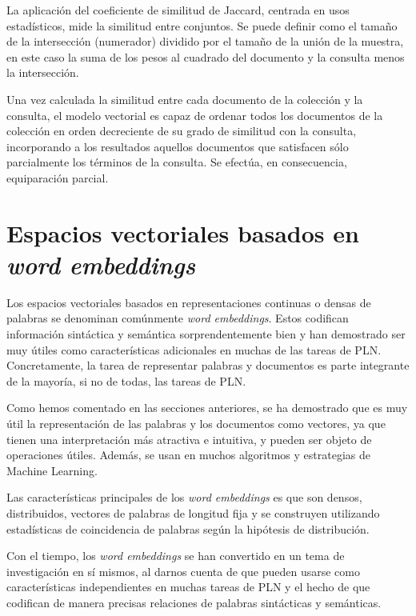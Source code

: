 \documentclass[titlepage]{article}
\begin{document}
	La aplicación del coeficiente de similitud de Jaccard, centrada en usos estadísticos, mide la similitud entre conjuntos. Se puede definir como el tamaño de la intersección (numerador) dividido por el tamaño de la unión de la muestra, en este caso la suma de los pesos al cuadrado del documento y la consulta menos la intersección.
	
	
	\newpage
	
	Una vez calculada la similitud entre cada documento de la colección y la consulta, el modelo vectorial es capaz de ordenar todos los documentos de la colección en orden decreciente de su grado de similitud con la consulta, incorporando a los resultados aquellos documentos que satisfacen sólo parcialmente los términos de la consulta. Se efectúa, en consecuencia, equiparación parcial.
	
	\section{Espacios vectoriales basados en \textit{word embeddings}}\label{espacios}
	
	Los espacios vectoriales basados en representaciones continuas o densas de palabras se denominan comúnmente \textit{word embeddings}\cite{wordembeddings}. Estos codifican información sintáctica y semántica sorprendentemente bien y han demostrado ser muy útiles como características adicionales en muchas de las tareas de PLN.  Concretamente, la tarea de representar palabras y documentos es parte integrante de la mayoría, si no de todas, las tareas de PLN. 
	
	Como hemos comentado en las secciones anteriores, se ha demostrado que es muy útil la representación de las palabras y los documentos como vectores, ya que tienen una interpretación más atractiva e intuitiva, y pueden ser objeto de operaciones útiles. Además, se usan en muchos algoritmos y estrategias de Machine Learning.
	
	Las características principales de los \textit{word embeddings} es que son densos, distribuidos, vectores de palabras de longitud fija y se construyen utilizando estadísticas de coincidencia de palabras según la hipótesis de distribución.
	
	Con el tiempo, los \textit{word embeddings} se han convertido en un tema de investigación en sí mismos, al darnos cuenta de que pueden usarse como características independientes en muchas tareas de PLN y el hecho de que codifican de manera precisas relaciones de palabras sintácticas y semánticas.
	
\end{document}
